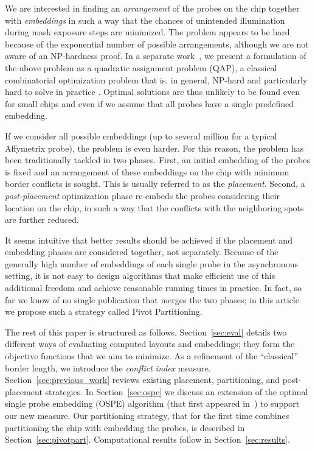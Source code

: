 \documentclass{llncs}
\begin{document}
We are interested in finding an \emph{arrangement} of the probes on the chip
together with \emph{embeddings} in such a way that the chances of unintended
illumination during mask exposure steps are minimized. The problem appears to
be hard because of the exponential number of possible arrangements, although
we are not aware of an NP-hardness proof.  In a separate
work~\cite{CARVALHO06}, we present a formulation of the above problem as a
quadratic assignment problem (QAP), a classical combinatorial optimization
problem that is, in general, NP-hard and particularly hard to solve in
practice \cite{CELA98}. Optimal solutions are thus unlikely to be found even
for small chips and even if we assume that all probes have a single predefined
embedding.

If we consider all possible embeddings (up to several million for a
typical Affymetrix probe), the problem is even harder.
For this reason, the problem has been traditionally tackled in two phases.
First, an initial embedding of the probes is fixed and an arrangement of these
embeddings on the chip with minimum border conflicts is sought. This is
usually referred to as the \emph{placement}. Second, a \emph{post-placement}
optimization phase re-embeds the probes considering their location on the chip,
in such a way that the conflicts with the neighboring spots are further
reduced.

It seems intuitive that better results should be achieved if the placement and
embedding phases are considered together, not separately. Because of the
generally high number of embeddings of each single probe in the asynchronous
setting, it is not easy to design algorithms that make efficient use of this
additional freedom and achieve reasonable running times in practice. In fact,
so far we know of no single publication that merges the two phases; in this
article we propose such a strategy called Pivot Partitioning.

The rest of this paper is structured as follows. Section~\ref{sec:eval}
details two different ways of evaluating computed layouts and embeddings; they
form the objective functions that we aim to minimize. As a refinement of the
``classical'' border length, we introduce the
\emph{conflict index} measure. Section~\ref{sec:previous_work} reviews
existing placement, partitioning, and post-placement strategies.  In
Section~\ref{sec:ospe} we discuss an extension of the optimal single probe
embedding (OSPE) algorithm (that first appeared in~\cite{KAHNG02}) to support
our new measure. Our
partitioning strategy, that for the first time combines partitioning the chip
with embedding the probes, is described in Section~\ref{sec:pivotpart}.
Computational results follow in Section~\ref{sec:results}.
\end{document}
